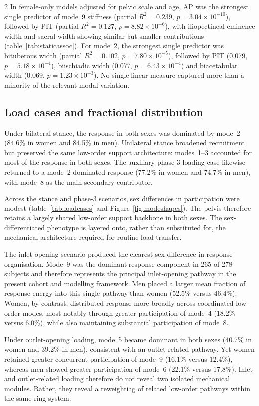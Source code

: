 \documentclass[openacc]{rsproca_new}
\begin{document}
\begin{multicols}{2}
In female-only models adjusted for pelvic scale and age, AP was the strongest single predictor of mode~9 stiffness (partial $R^2=0.239$, $p=3.04 \times 10^{-10}$), followed by PIT (partial $R^2=0.127$, $p=8.82 \times 10^{-6}$), with iliopectineal eminence width and sacral width showing similar but smaller contributions (table~\ref{tab:staticassoc}). For mode~2, the strongest single predictor was bituberous width (partial $R^2=0.102$, $p=7.80 \times 10^{-5}$), followed by PIT (0.079, $p=5.18 \times 10^{-4}$), biischiadic width (0.077, $p=6.43 \times 10^{-4}$) and biacetabular width (0.069, $p=1.23 \times 10^{-3}$). No single linear measure captured more than a minority of the relevant modal variation.

\subsection{Load cases and fractional distribution}

Under bilateral stance, the response in both sexes was dominated by mode~2 (84.6\% in women and 84.5\% in men). Unilateral stance broadened recruitment but preserved the same low-order support architecture: modes~1--3 accounted for most of the response in both sexes. The auxiliary phase-3 loading case likewise returned to a mode~2-dominated response (77.2\% in women and 74.7\% in men), with mode~8 as the main secondary contributor.

Across the stance and phase-3 scenarios, sex differences in participation were modest (table~\ref{tab:loadcases} and Figure~\ref{fig:modeshapes}). The pelvis therefore retains a largely shared low-order support backbone in both sexes. The sex-differentiated phenotype is layered onto, rather than substituted for, the mechanical architecture required for routine load transfer.

The inlet-opening scenario produced the clearest sex difference in response organisation. Mode~9 was the dominant response component in 265 of 278 subjects and therefore represents the principal inlet-opening pathway in the present cohort and modelling framework. Men placed a larger mean fraction of response energy into this single pathway than women (52.5\% versus 46.4\%). Women, by contrast, distributed response more broadly across coordinated low-order modes, most notably through greater participation of mode~4 (18.2\% versus 6.0\%), while also maintaining substantial participation of mode~8.

Under outlet-opening loading, mode~5 became dominant in both sexes (40.7\% in women and 39.2\% in men), consistent with an outlet-related pathway. Yet women retained greater concurrent participation of mode~9 (16.1\% versus 12.4\%), whereas men showed greater participation of mode~6 (22.1\% versus 17.8\%). Inlet- and outlet-related loading therefore do not reveal two isolated mechanical modules. Rather, they reveal a reweighting of related low-order pathways within the same ring system.


\end{multicols}
\end{document}
